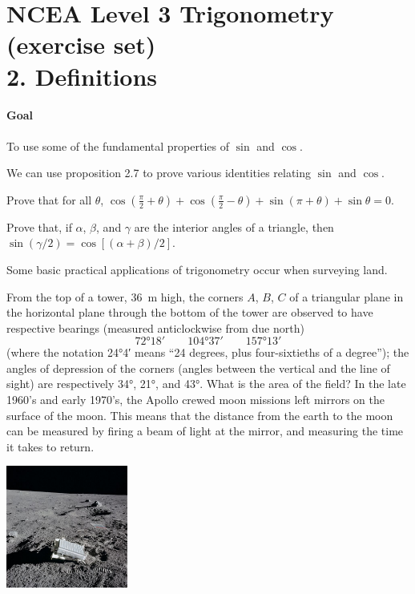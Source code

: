 \documentclass[answers]{exam}
\begin{document}
\section*{NCEA Level 3 Trigonometry (exercise set)\\2. Definitions}
\paragraph{Goal} To use some of the fundamental properties of $ \sin $ and $ \cos $.

\begin{questions}
  \question We can use proposition 2.7 to prove various identities relating $ \sin $ and $ \cos $.
    \begin{parts}
      \item Prove that for all $ \theta $, $ \cos \left( \frac{\pi}{2} + \theta \right) + \cos \left( \frac{\pi}{2} - \theta \right) + \sin (\pi + \theta) + \sin \theta = 0 $.
      \item Prove that, if $ \alpha $, $ \beta $, and $ \gamma $ are the interior angles of a triangle, then $ \sin (\gamma/2) = \cos [(\alpha + \beta)/2] $.
    \end{parts}
  \question Some basic practical applications of trigonometry occur when surveying land.

            From the top of a tower, \SI{36}{\metre} high, the corners $ A $, $ B $, $ C $ of a triangular
            plane in the horizontal plane through the bottom of the tower are observed to have respective bearings (measured
            anticlockwise from due north)
            \begin{displaymath}
              \ang{72;18;} \qquad \ang{104;37;} \qquad \ang{157;13;}
            \end{displaymath}
            (where the notation \ang{24;4;} means ``24 degrees, plus four-sixtieths of a degree''); the angles of depression
            of the corners (angles between the vertical and the line of sight) are respectively \ang{34}, \ang{21}, and \ang{43}.
            What is the area of the field?
  \question In the late 1960's and early 1970's, the Apollo crewed moon missions left mirrors on the surface of the moon. This means
            that the distance from the earth to the moon can be measured by firing a beam of light at the mirror, and measuring the
            time it takes to return.

            \begin{center}
              \includegraphics[width=0.3\textwidth]{exercises-2-2}
            \end{center}


\end{questions}
\end{document}
